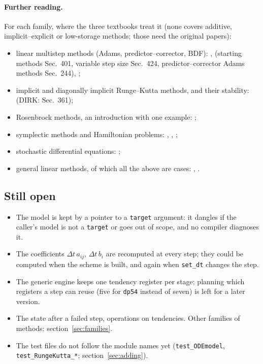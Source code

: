 \documentclass[11pt,a4paper]{article}
\newcommand{\dt}{\Delta t}
\newcommand{\code}[1]{\texttt{#1}}
\begin{document}
\paragraph{Further reading.} For each family, where the three textbooks treat
it (none covers additive, implicit--explicit or low-storage methods; those
need the original papers):
\begin{itemize}
  \item linear multistep methods (Adams, predictor--corrector, BDF):
    \cite[Chs.~4--8]{gh2010}, \cite[Ch.~4]{butcher2016} (starting methods
    Sec.~401, variable step size Sec.~424, predictor--corrector Adams
    methods Sec.~244), \cite[Sec.~6.2]{butcher2021};
  \item implicit and diagonally implicit Runge--Kutta methods, and their
    stability: \cite[Secs.~34--36]{butcher2016} (DIRK: Sec.~361);
  \item Rosenbrock methods, an introduction with one example:
    \cite[Sec.~254]{butcher2016};
  \item symplectic methods and Hamiltonian problems: \cite[Ch.~15]{gh2010},
    \cite[Sec.~39]{butcher2016}, \cite[Ch.~7]{butcher2021};
  \item stochastic differential equations: \cite[Ch.~16]{gh2010};
  \item general linear methods, of which all the above are cases:
    \cite[Ch.~5]{butcher2016}, \cite[Ch.~6]{butcher2021}.
\end{itemize}

\subsection{Still open}
\begin{itemize}
  \item The model is kept by a pointer to a \code{target} argument: it dangles
    if the caller's model is not a \code{target} or goes out of scope, and no
    compiler diagnoses it.
  \item The coefficients $\dt\, a_{ij}$, $\dt\, b_i$ are recomputed at every
    step; they could be computed when the scheme is built, and again when
    \code{set\_dt} changes the step.
  \item The generic engine keeps one tendency register per stage; planning
    which registers a step can reuse (five for \code{dp54} instead of seven)
    is left for a later version.
  \item The state after a failed step, operations on tendencies. Other
    families of methods: section~\ref{sec:families}.
  \item The test files do not follow the module names yet
    (\code{test\_ODEmodel}, \code{test\_RungeKutta\_*}; section~\ref{sec:adding}).
\end{itemize}


\end{document}
